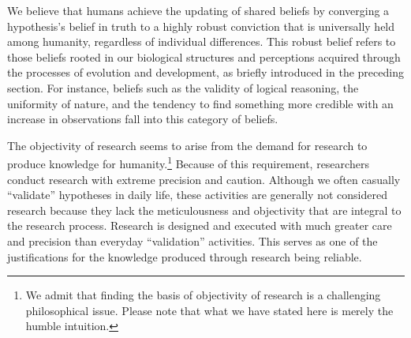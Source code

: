 \documentclass{book}
\begin{document}


We believe that humans achieve the updating of shared beliefs by converging a hypothesis's belief in truth to a highly robust conviction that is universally held among humanity, regardless of individual differences. This robust belief refers to those beliefs rooted in our biological structures and perceptions acquired through the processes of evolution and development, as briefly introduced in the preceding section. For instance, beliefs such as the validity of logical reasoning, the uniformity of nature, and the tendency to find something more credible with an increase in observations fall into this category of beliefs. 

The objectivity of research seems to arise from the demand for research to produce knowledge for humanity.\footnote{We admit that finding the basis of objectivity of research is a challenging philosophical issue. Please note that what we have stated here is merely the humble intuition. } Because of this requirement, researchers conduct research with extreme precision and caution. Although we often casually ``validate'' hypotheses in daily life, these activities are generally not considered research because they lack the meticulousness and objectivity that are integral to the research process. Research is designed and executed with much greater care and precision than everyday ``validation'' activities. This serves as one of the justifications for the knowledge produced through research being reliable.
\end{document}

